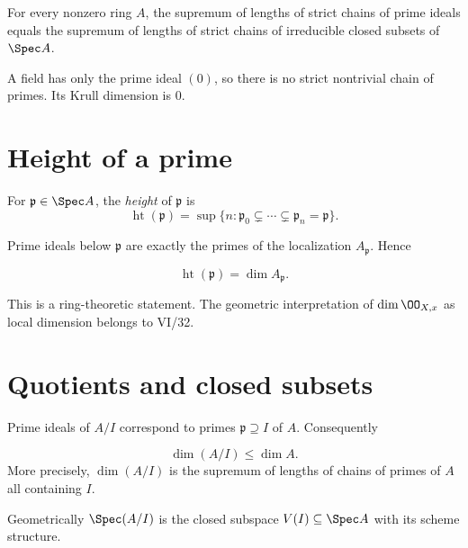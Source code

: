 \begin{proposition}\label{prop:vi29-affine-chain-dictionary}
For every nonzero ring $A$, the supremum of lengths of strict chains of prime ideals equals the supremum of lengths
of strict chains of irreducible closed subsets of $\Spec A$.
\end{proposition}



\begin{example}\label{ex:vi29-expand-01}
A field has only the prime ideal $(0)$, so there is no strict nontrivial chain of primes.  Its Krull dimension is $0$.
\end{example}
\section{Height of a prime}
\begin{definition}[Height]\label{def:vi29-height}
For $\mathfrak p\in\Spec A$, the \emph{height} of $\mathfrak p$ is
\[
\operatorname{ht}(\mathfrak p)=\sup\{n:\mathfrak p_0\subsetneq\cdots\subsetneq\mathfrak p_n=\mathfrak p\}.
\]
\end{definition}
Prime ideals below $\mathfrak p$ are exactly the primes of the localization $A_{\mathfrak p}$.  Hence
\begin{proposition}\label{prop:vi29-height-localization}
\[
\operatorname{ht}(\mathfrak p)=\dim A_{\mathfrak p}.
\]
\end{proposition}
This is a ring-theoretic statement.  The geometric interpretation of $\dim\OO_{X,x}$ as local dimension belongs to
VI/32.



\section{Quotients and closed subsets}
Prime ideals of $A/I$ correspond to primes $\mathfrak p\supseteq I$ of $A$.  Consequently
\begin{proposition}\label{prop:vi29-quotient-dimension}
\[
\dim(A/I)\leq\dim A.
\]
More precisely, $\dim(A/I)$ is the supremum of lengths of chains of primes of $A$ all containing $I$.
\end{proposition}
Geometrically $\Spec(A/I)$ is the closed subspace $V(I)\subseteq\Spec A$ with its scheme structure.

